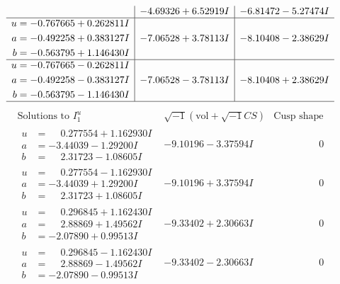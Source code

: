 \documentclass[1p]{elsarticle_modified}
\theoremstyle{definition}
\newcommand{\I}{\sqrt{-1}}
\begin{document}
$$\begin{array}{c|c|c}
 & -4.69326 + 6.52919 I & -6.81472 - 5.27474 I \\ \hline\begin{aligned}
u &= -0.767665 + 0.262811 I \\
a &= -0.492258 + 0.383127 I \\
b &= -0.563795 + 1.146430 I\end{aligned}
 & -7.06528 + 3.78113 I & -8.10408 - 2.38629 I \\ \hline\begin{aligned}
u &= -0.767665 - 0.262811 I \\
a &= -0.492258 - 0.383127 I \\
b &= -0.563795 - 1.146430 I\end{aligned}
 & -7.06528 - 3.78113 I & -8.10408 + 2.38629 I\\
 \hline 
 \end{array}$$\newpage$$\begin{array}{c|c|c}  
\text{Solutions to }I^u_{1}& \I (\text{vol} + \sqrt{-1}CS) & \text{Cusp shape}\\
 \hline 
\begin{aligned}
u &= \phantom{-}0.277554 + 1.162930 I \\
a &= -3.44039 - 1.29200 I \\
b &= \phantom{-}2.31723 - 1.08605 I\end{aligned}
 & -9.10196 - 3.37594 I & \phantom{-0.000000 } 0 \\ \hline\begin{aligned}
u &= \phantom{-}0.277554 - 1.162930 I \\
a &= -3.44039 + 1.29200 I \\
b &= \phantom{-}2.31723 + 1.08605 I\end{aligned}
 & -9.10196 + 3.37594 I & \phantom{-0.000000 } 0 \\ \hline\begin{aligned}
u &= \phantom{-}0.296845 + 1.162430 I \\
a &= \phantom{-}2.88869 + 1.49562 I \\
b &= -2.07890 + 0.99513 I\end{aligned}
 & -9.33402 + 2.30663 I & \phantom{-0.000000 } 0 \\ \hline\begin{aligned}
u &= \phantom{-}0.296845 - 1.162430 I \\
a &= \phantom{-}2.88869 - 1.49562 I \\
b &= -2.07890 - 0.99513 I\end{aligned}
 & -9.33402 - 2.30663 I & \phantom{-0.000000 } 0 \\ \hline\begin{aligned}

\end{aligned}
\end{array}$$
\end{document}
